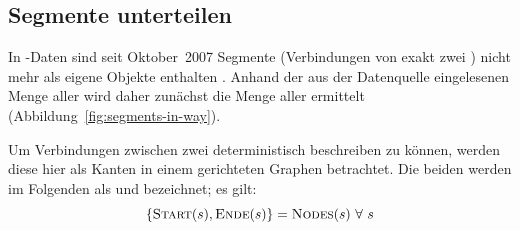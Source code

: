 \documentclass[../main/thesis.tex]{subfiles}
\begin{document}
\subsection{Segmente unterteilen}
\label{ch:split-algorithm}

In \osm-Daten sind seit Oktober~2007 Segmente (Verbindungen von exakt zwei ) nicht mehr als eigene Objekte enthalten .
Anhand der aus der Datenquelle eingelesenen Menge aller  wird daher zunächst die Menge aller  ermittelt (Abbildung~\ref{fig:segments-in-way}).


Um Verbindungen zwischen zwei  deterministisch beschreiben zu können, werden diese hier als Kanten in einem gerichteten Graphen betrachtet.
Die beiden  werden im Folgenden als  und  bezeichnet; es gilt:
\[
\Set{\textproc{Start}(s), \textproc{Ende}(s)} = \textproc{Nodes}(s)\ \forall\ s
\]
\end{document}
